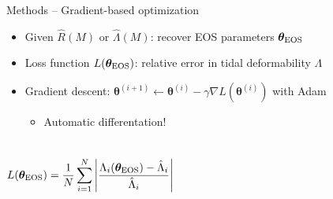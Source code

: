 \documentclass[usenames,dvipsnames,t]{beamer}
\newcommand{\thetaeos}{\boldsymbol{\theta}_{\rm{EOS}}}
\newcommand{\boldtheta}{\boldsymbol{\theta}}
\begin{document}
\begin{frame}{Methods -- Gradient-based optimization}

  \def\x{2mm}

  \begin{itemize}


    \item Given $\hat{R}(M)$ or $\hat{\Lambda}(M)$: recover EOS parameters $\thetaeos$

    \vspace{\x}
    
    \item Loss function $L(\thetaeos)$: relative error in tidal deformability $\Lambda$
    
    \vspace{\x}

    \item Gradient descent: $\boldtheta^{(i+1)} \leftarrow \boldtheta^{(i)} - \gamma \nabla L(\boldtheta^{(i)})$ with Adam
    
    \begin{itemize}
      \item Automatic differentation! %
    \end{itemize}

  \end{itemize}

  \vspace{-3mm}

  \begin{columns}


    \small
    \begin{equation*}
      L(\thetaeos) = \frac1N \sum_{i=1}^N \left| \frac{\Lambda_i(\thetaeos) - \hat{\Lambda}_i}{\hat{\Lambda}_i} \right|
    \end{equation*}

    \normalsize



\end{columns}
\end{frame}
\end{document}
